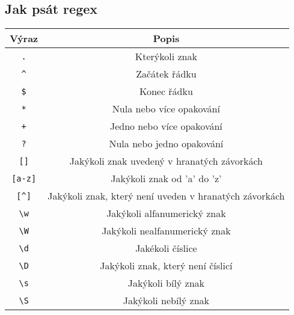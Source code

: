 \documentclass{article}
\begin{document}
\subsection{Jak psát regex}
\begin{center}
\begin{tabular}{|c|c|}
\hline
\textbf{Výraz} & \textbf{Popis} \\
\hline
\texttt{.} & Kterýkoli znak \\
\texttt{\^} & Začátek řádku \\
\texttt{\$} & Konec řádku \\
\texttt{*} & Nula nebo více opakování \\
\texttt{+} & Jedno nebo více opakování \\
\texttt{?} & Nula nebo jedno opakování \\
\texttt{[]} & Jakýkoli znak uvedený v hranatých závorkách \\
\texttt{[a-z]} & Jakýkoli znak od 'a' do 'z' \\
\texttt{[\^{}]} & Jakýkoli znak, který není uveden v hranatých závorkách \\
\texttt{\textbackslash{}w} & Jakýkoli alfanumerický znak \\
\texttt{\textbackslash{}W} & Jakýkoli nealfanumerický znak \\
\texttt{\textbackslash{}d} & Jakékoli číslice \\
\texttt{\textbackslash{}D} & Jakýkoli znak, který není číslicí \\
\texttt{\textbackslash{}s} & Jakýkoli bílý znak \\
\texttt{\textbackslash{}S} & Jakýkoli nebílý znak \\
\hline
\end{tabular}
\end{center}
\end{document}
